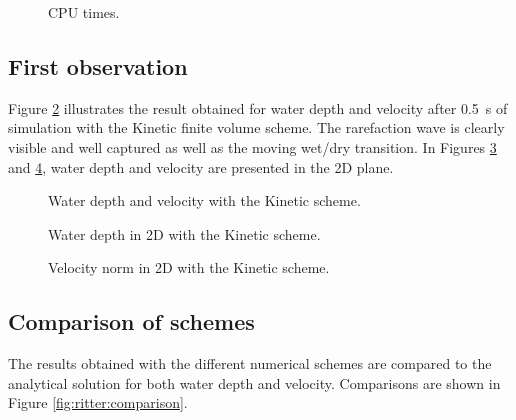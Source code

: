 \begin{figure}[H]
  \centering
  \caption{CPU times.}\label{fig:ritter:cputime}
\end{figure}

\subsection{First observation}

Figure \ref{fig:ritter:firstobs1d} illustrates the result obtained for water
depth and velocity after 0.5~s of simulation with the Kinetic finite volume scheme.
The rarefaction wave is clearly visible and well
captured as well as the moving wet/dry transition.
In Figures \ref{fig:ritter:Hfirstobs1d} and  \ref{fig:ritter:Ufirstobs1d},
water depth and velocity are presented in the 2D plane.

\begin{figure}[H]
\begin{minipage}[t]{0.5\textwidth}
 \centering
\end{minipage}
\begin{minipage}[t]{0.5\textwidth}
 \centering
\end{minipage}
  \caption{Water depth and velocity with the Kinetic scheme.}
  \label{fig:ritter:firstobs1d}
\end{figure}

\begin{figure}[H]
 \centering
  \caption{Water depth in 2D with the Kinetic scheme.}
  \label{fig:ritter:Hfirstobs1d}
\end{figure}

\begin{figure}[H]
 \centering
  \caption{Velocity norm in 2D with the Kinetic scheme.}
  \label{fig:ritter:Ufirstobs1d}
\end{figure}

\subsection{Comparison of schemes}

The results obtained with the different numerical schemes are compared to the
analytical solution for both water depth and velocity.
Comparisons are shown in Figure \ref{fig:ritter:comparison}.

